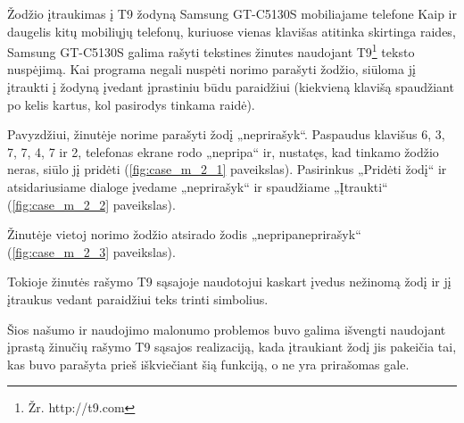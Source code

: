 \begin{xcase}{Žodžio įtraukimas į T9 žodyną Samsung GT-C5130S mobiliajame
              telefone}
  \xcgoal
  {
    Kaip ir daugelis kitų mobiliųjų telefonų, kuriuose vienas klavišas
    atitinka skirtinga raides, Samsung GT-C5130S galima rašyti tekstines
    žinutes naudojant T9\footnote{Žr. http://t9.com} teksto nuspėjimą. Kai
    programa negali nuspėti norimo parašyti žodžio, siūloma jį įtraukti į
    žodyną įvedant įprastiniu būdu paraidžiui (kiekvieną klavišą spaudžiant
    po kelis kartus, kol pasirodys tinkama raidė).
  }
  
  \xctools
  { %
    Pavyzdžiui, žinutėje norime parašyti žodį „neprirašyk“. Paspaudus
    klavišus 6, 3, 7, 7, 4, 7 ir 2, telefonas ekrane rodo „nepripa“ ir,
    nustatęs, kad tinkamo žodžio neras, siūlo jį pridėti
    (\ref{fig:case_m_2_1} paveikslas). Pasirinkus „Pridėti žodį“ ir
    atsidariusiame dialoge įvedame „neprirašyk“ ir spaudžiame
    „Įtraukti“ (\ref{fig:case_m_2_2} paveikslas).

  }
  
  \xcresult
  {
    Žinutėje vietoj norimo žodžio atsirado žodis „nepripaneprirašyk“ (\ref{fig:case_m_2_3} paveikslas).
    
  }
  
  \xcprinciples
  {
    {
      Tokioje žinutės rašymo T9 sąsajoje naudotojui kaskart įvedus nežinomą
      žodį ir jį įtraukus vedant paraidžiui teks trinti simbolius.
    }
  }
  
  \xcthoughts
  {
    Šios našumo ir naudojimo malonumo problemos buvo galima išvengti
    naudojant įprastą žinučių rašymo T9 sąsajos realizaciją, kada įtraukiant
    žodį jis pakeičia tai, kas buvo parašyta prieš iškviečiant šią funkciją,
    o ne yra prirašomas gale.
  }
\end{xcase}

